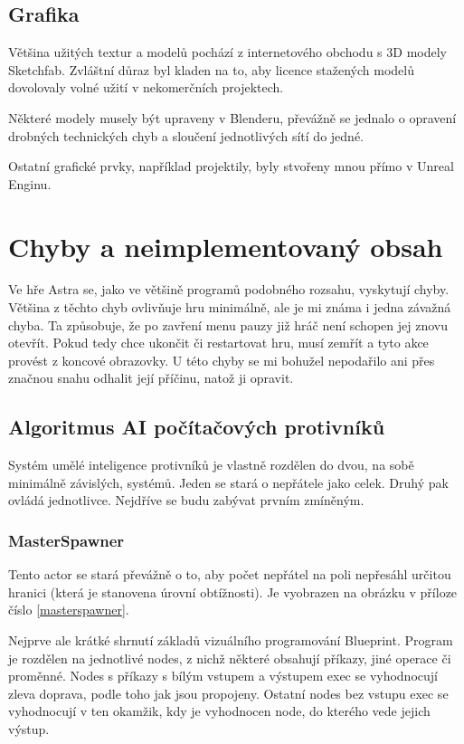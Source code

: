 \documentclass[12pt,a4paper,hidelinks]{article}
\begin{document}
\subsection{Grafika}
Většina užitých textur a modelů pochází z internetového obchodu s 3D modely Sketchfab. Zvláštní důraz byl kladen na to, aby licence stažených modelů dovolovaly volné užití v nekomerčních projektech.

Některé modely musely být upraveny v Blenderu, převážně se jednalo o opravení drobných technických chyb a sloučení jednotlivých sítí do jedné.

Ostatní grafické prvky, například projektily, byly stvořeny mnou přímo v Unreal Enginu.

\section{Chyby a neimplementovaný obsah}
Ve hře Astra se, jako ve většině programů podobného rozsahu, vyskytují chyby. Většina z těchto chyb ovlivňuje hru minimálně, ale je mi známa i jedna závažná chyba. Ta způsobuje, že po zavření menu pauzy již hráč není schopen jej znovu otevřít. Pokud tedy chce ukončit či restartovat hru, musí zemřít a tyto akce provést z koncové obrazovky. U této chyby se mi bohužel nepodařilo ani přes značnou snahu odhalit její příčinu, natož ji opravit.

\subsection{Algoritmus AI počítačových protivníků}
Systém umělé inteligence protivníků je vlastně rozdělen do dvou, na sobě minimálně závislých, systémů. Jeden se stará o nepřátele jako celek. Druhý pak ovládá jednotlivce. Nejdříve se budu zabývat prvním zmíněným.


\subsubsection{MasterSpawner}
Tento actor se stará převážně o to, aby počet nepřátel na poli nepřesáhl určitou hranici (která je stanovena úrovní obtížnosti). Je vyobrazen na obrázku v příloze číslo \ref{masterspawner}.

Nejprve ale krátké shrnutí základů vizuálního programování Blueprint. Program je rozdělen na jednotlivé nodes, z nichž některé obsahují příkazy, jiné operace či proměnné. Nodes s příkazy s bílým vstupem a výstupem exec se vyhodnocují zleva doprava, podle toho jak jsou propojeny. Ostatní nodes bez vstupu exec se vyhodnocují v ten okamžik, kdy je vyhodnocen node, do kterého vede jejich výstup.
\end{document}
